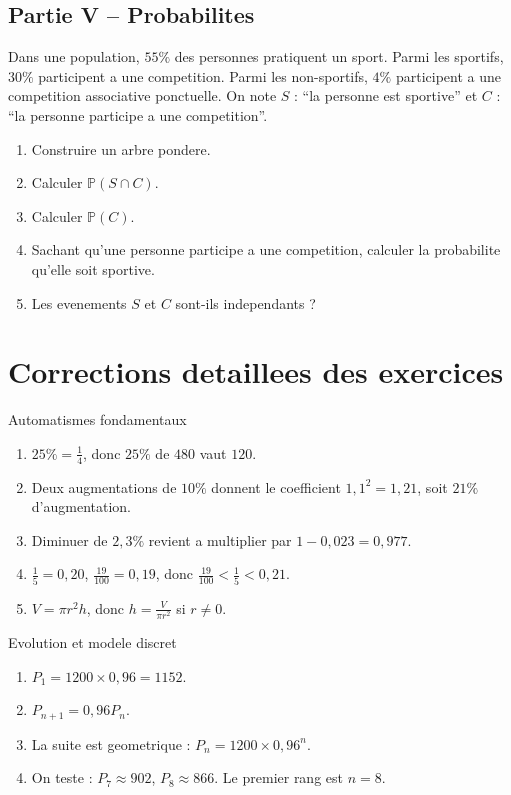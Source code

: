 \documentclass[11pt,a4paper]{article}
\newcounter{exercice}
\newcounter{corrige}
\newcommand{\Pp}{\mathbb{P}}
\begin{document}
\subsection*{Partie V -- Probabilites}
Dans une population, $55\%$ des personnes pratiquent un sport. Parmi les sportifs, $30\%$ participent a une competition. Parmi les non-sportifs, $4\%$ participent a une competition associative ponctuelle.
On note $S$ : ``la personne est sportive'' et $C$ : ``la personne participe a une competition''.
\begin{enumerate}
  \item Construire un arbre pondere.
  \item Calculer $\Pp(S\cap C)$.
  \item Calculer $\Pp(C)$.
  \item Sachant qu'une personne participe a une competition, calculer la probabilite qu'elle soit sportive.
  \item Les evenements $S$ et $C$ sont-ils independants ?
\end{enumerate}

\newpage
\section{Corrections detaillees des exercices}

\setcounter{corrige}{0}

\begin{corrbox}{Automatismes fondamentaux}
\begin{enumerate}
  \item $25\%=\frac14$, donc $25\%$ de $480$ vaut $120$.
  \item Deux augmentations de $10\%$ donnent le coefficient $1,1^2=1,21$, soit $21\%$ d'augmentation.
  \item Diminuer de $2,3\%$ revient a multiplier par $1-0,023=0,977$.
  \item $\frac15=0,20$, $\frac{19}{100}=0,19$, donc $\frac{19}{100}<\frac15<0,21$.
  \item $V=\pi r^2h$, donc $h=\frac{V}{\pi r^2}$ si $r\ne0$.
\end{enumerate}
\end{corrbox}

\begin{corrbox}{Evolution et modele discret}
\begin{enumerate}
  \item $P_1=1200\times0,96=1152$.
  \item $P_{n+1}=0,96P_n$.
  \item La suite est geometrique : $P_n=1200\times0,96^n$.
  \item On teste : $P_7\approx902$, $P_8\approx866$. Le premier rang est $n=8$.
\end{enumerate}
\end{corrbox}
\end{document}
